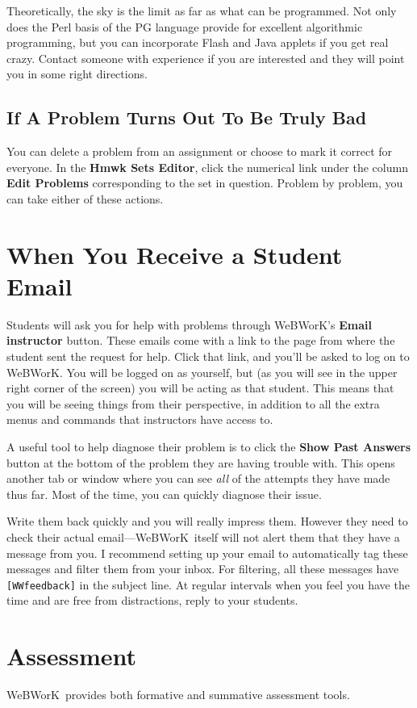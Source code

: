 \documentclass[12pt]{article}
\newcommand{\menu}[1]{\textbf{#1}}
\newcommand{\WW}{WeBWorK}
\newcommand{\HSE}{\menu{Hmwk Sets Editor}}
\begin{document}
Theoretically, the sky is the limit as far as what can be programmed.  Not only does the Perl basis of the PG language provide for excellent algorithmic programming, but you can incorporate Flash and Java applets if you get real crazy. Contact someone with experience if you are interested and they will point you in some right directions.

\subsection{If A Problem Turns Out To Be Truly Bad}
You can delete a problem from an assignment or choose to mark it correct for everyone.   In the \HSE, click the numerical link under the column \menu{Edit Problems} corresponding to the set in question.  Problem by problem, you can take either of these actions.

\section{When You Receive a Student Email}
Students will ask you for help with problems through \WW's \menu{Email instructor} button.  These emails come with a link to the page from where the student sent the request for help.  Click that link, and you'll be asked to log on to \WW.  You will be logged on as yourself, but (as you will see in the upper right corner of the screen) you will be acting as that student.  This means that you will be seeing things from their perspective, in addition to all the extra menus and commands that instructors have access to.

A useful tool to help diagnose their problem is to click the \menu{Show Past Answers} button at the bottom of the problem they are having trouble with.  This opens another tab or window where you can see \emph{all} of the attempts they have made thus far.  Most of the time, you can quickly diagnose their issue.

Write them back quickly and you will really impress them.  However they need to check their actual email---\WW\ itself will not alert them that they have a message from you. I recommend setting up your email to automatically tag these messages and filter them from your inbox. For filtering, all these messages have \texttt{[WWfeedback]} in the subject line. At regular intervals when you feel you have the time and are free from distractions, reply to your students.

\section{Assessment}
\WW\ provides both formative and summative assessment tools.
\end{document}
